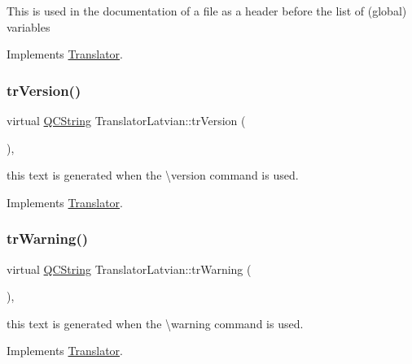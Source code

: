 This is used in the documentation of a file as a header before the list of (global) variables 

Implements \mbox{\hyperlink{class_translator}{Translator}}.

\mbox{\label{class_translator_latvian_a44c017266b7fa7bac7299280adda2e03}} 
\subsubsection{\texorpdfstring{trVersion()}{trVersion()}}
{\footnotesize\ttfamily virtual \mbox{\hyperlink{class_q_c_string}{Q\+C\+String}} Translator\+Latvian\+::tr\+Version (\begin{DoxyParamCaption}{ }\end{DoxyParamCaption})\hspace{0.3cm}{\ttfamily [inline]}, {\ttfamily [virtual]}}

this text is generated when the \textbackslash{}version command is used. 

Implements \mbox{\hyperlink{class_translator}{Translator}}.

\mbox{\label{class_translator_latvian_ac0fdbd5b68297fd28f8d0acf594474cc}} 
\subsubsection{\texorpdfstring{trWarning()}{trWarning()}}
{\footnotesize\ttfamily virtual \mbox{\hyperlink{class_q_c_string}{Q\+C\+String}} Translator\+Latvian\+::tr\+Warning (\begin{DoxyParamCaption}{ }\end{DoxyParamCaption})\hspace{0.3cm}{\ttfamily [inline]}, {\ttfamily [virtual]}}

this text is generated when the \textbackslash{}warning command is used. 

Implements \mbox{\hyperlink{class_translator}{Translator}}.

\mbox{\label{class_translator_latvian_a8fde583c9c1d5dba53242a8dff8ff6c9}} 

